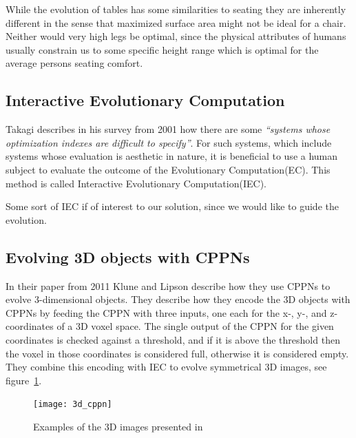 While the evolution of tables has some similarities to seating they are inherently
different in the sense that maximized surface area might not be ideal for a
chair.
Neither would very high legs be optimal, since the physical attributes of humans
usually constrain us to some specific height range which is optimal for the
average persons seating comfort.

\subsection{Interactive Evolutionary Computation}
Takagi describes in his survey from 2001\cite{Takagi2001} how there are some \emph{``systems whose optimization indexes are difficult to specify''}\cite[p.~1275]{Takagi2001}.
For such systems, which include systems whose evaluation is aesthetic in nature, it is beneficial to use a human subject to evaluate the outcome of the Evolutionary Computation(EC).
This method is called Interactive Evolutionary Computation(IEC).

Some sort of IEC if of interest to our solution, since we would like to guide the evolution. 

\subsection{Evolving 3D objects with CPPNs}
In their paper from 2011 Klune and Lipson describe how they use CPPNs to evolve 3-dimensional objects\cite{Clune:2011:EOG:2078245.2078246}.
They describe how they encode the 3D objects with CPPNs by feeding the CPPN with three inputs, one each for the x-, y-, and z- coordinates of a 3D voxel space.
The single output of the CPPN for the given coordinates is checked against a threshold, and if it is above the threshold then the voxel in those coordinates is considered full, otherwise it is considered empty\cite[p.~5]{Clune:2011:EOG:2078245.2078246}.
They combine this encoding with IEC to evolve symmetrical 3D images, see figure~\ref{fig:3dobjects}.
\begin{figure}[ht]
\centering
\texttt{[image: 3d\_cppn]}
\caption{Examples of the 3D images presented in \cite{Clune:2011:EOG:2078245.2078246}}
\label{fig:3dobjects}
\end{figure}


